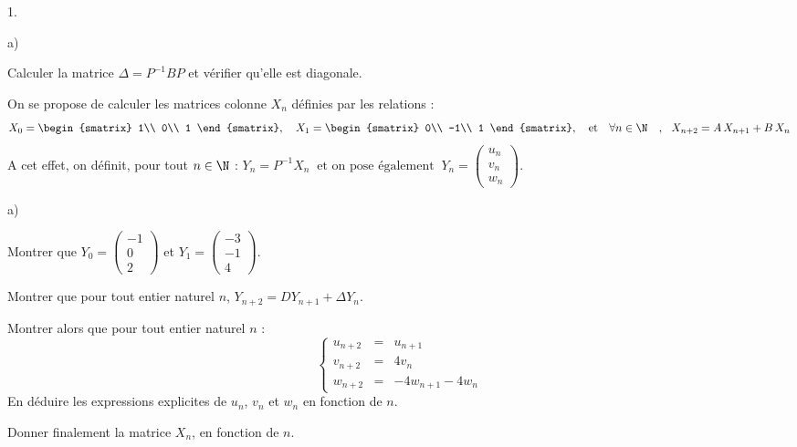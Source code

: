 \documentclass[11pt]{article}%
\begin{document}
\begin{exercice}
\begin{noliste}{1.}
\begin{noliste}{a)}
\item
Calculer la matrice $\Delta = P^{-1}BP$ et vérifier qu'elle est 
diagonale.
\end{noliste}
\item
On se propose de calculer les matrices colonne $X_n$ définies par les 
relations :
\[
X_0= 
\begin{smatrix}
1\\ 0\\ 1
\end{smatrix} 
, \quad  X_1 = 
\begin{smatrix}
0\\ -1\\ 1
\end{smatrix} 
,\quad \mathrm{et} \quad \forall n \in 
\N\quad ,\ \ X_{n + 2} = A \, X_{n + 1} + B \, X_n
\]
A cet effet, on définit, pour tout $n\in\N$ : \quad $Y_{n} = P^{ - 
1}X_{n} \ \text{ et on pose également }\ Y_{n} = \begin{pmatrix}
 {u_{n}}    \\
 {v_{n}}  \\
 {w_{n}}  \end{pmatrix} .$
\begin{noliste}{a)}
\item
Montrer que $Y_{0} = \begin{pmatrix}
 { - 1}   \\
 {0} \\
 {2}   
\end{pmatrix}$ et $Y_{1} = \begin{pmatrix} { - 3}  
\\-1\\4\end{pmatrix}$.

\item
Montrer que pour tout entier naturel $n$,  $Y_{n + 2} = DY_{n + 1} 
+ \Delta Y_{n}.$

\item
Montrer alors que pour tout entier naturel $n$ :
\[
\left\lbrace
\begin{array}{rcl}
 {u_{n + 2}}  & =&  {u_{n + 1}}  \\
 {v_{n + 2}}   & { =} & {4v_{n}}  \\
 {w_{n + 2}}& { =}   & { - 4w_{n + 1} - 4w_{n}} \end{array} \right.
\]
En déduire les expressions explicites de $u_{n}$, $v_{n}$ et $w_{n}$ 
en fonction de $n$.
\item
Donner finalement la matrice $X_{n}$, en fonction de $n$.
\end{noliste}
\end{noliste}
\end{exercice}
\end{document}
